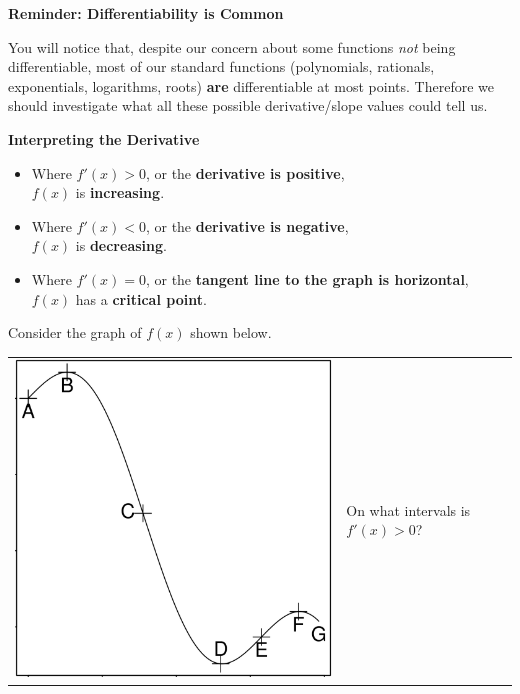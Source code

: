{\bf Reminder: Differentiability is Common}

You will notice that, despite our concern about some functions {\em
  not} being differentiable, most of our standard functions
(polynomials, rationals, exponentials, logarithms, roots) {\bf are}
differentiable at most points.  Therefore we should investigate what
all these possible derivative/slope values could tell us.

\vspace{0.5in}


{\bf Interpreting the Derivative}


\begin{boxnote}

\begin{itemize}
\item Where $f'(x) > 0$, or the {\bf derivative is positive}, \\
  $f(x)$ is {\bf increasing}. \\[1ex]
\item Where $f'(x) < 0$, or the {\bf derivative is negative}, \\
  $f(x)$ is {\bf decreasing}. \\[1ex]
\item Where $f'(x) = 0$, or the {\bf tangent line to the graph is
    horizontal}, $f(x)$ has a {\bf critical point}.
\end{itemize}
\end{boxnote}

\newpage

\problem Consider the graph of $f(x)$ shown below. 

\begin{tabular}{ll}
\begin{minipage}{5in}
\includegraphics[width=5in]{graphics/notes_01_incr_decr}
\end{minipage} &
\begin{minipage}{4.5in}
On what intervals is $f'(x) > 0$?
\end{minipage}
\end{tabular}

